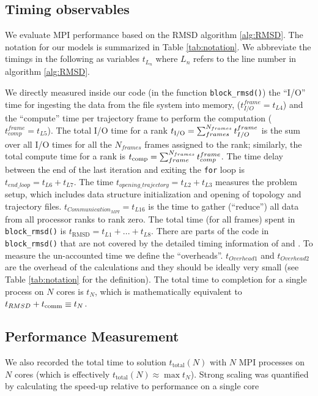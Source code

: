 \label{methods}

\subsection{Timing observables}
We evaluate MPI performance based on the RMSD algorithm \ref{alg:RMSD}. 
The notation for our models is summarized in Table \ref{tab:notation}.
We abbreviate the timings in the following as variables $t_{L_{n}}$ where $L_{n}$ refers to the line number in algorithm \ref{alg:RMSD}.

We directly measured inside our code (in the function \texttt{block\_rmsd()}) the ``I/O'' time for
ingesting the data from the file system into memory, ($t_{I/O}^{frame} = t_{L4}$) and the ``compute'' time per
trajectory frame to perform the computation ($t_{comp}^{frame} = t_{L5}$).
The total I/O time for a rank  ${t}_{\text{I/O}} = \sum_{frames}^{N_{frames}} t_{I/O}^{frame}$ is the sum over all I/O times for all the $N_{frames}$ frames assigned to the rank; similarly, the total compute time for a rank is ${t}_{\text{comp}} = \sum_{frame}^{N_{frames}} t_{comp}^{frame}$. 
The time delay between the end of the last iteration and exiting the \texttt{for} loop is $t_{end\_loop} = t_{L6}+t_{L7}$.
The time $t_{opening\_trajectory} = t_{L2}+t_{L3}$ measures the problem setup, which includes data structure initialization and opening of topology and trajectory files.
$t_{Communication_{MPI}} = t_{L16}$ is the time to gather (``reduce'') all data from all processor ranks to rank zero.
The total time (for all frames) spent in \texttt{block\_rmsd()} is $t_{\text{RMSD}} = t_{L1} + ...+ t_{L8}$. 
There are parts of the code in \texttt{block\_rmsd()} that are not covered by the detailed timing information of \tcomp and \tIO. 
To measure the un-accounted time we define the ``overheads''.
$t_{Overhead1}$ and $t_{Overhead2}$ are the overhead of the calculations and they should be ideally very small (see Table \ref{tab:notation} for the definition).  
The total time to completion for a single process on $N$ cores is $t_{N}$, which is mathematically equivalent to
$ t_{RMSD} + t_{\text{comm}} \equiv t_{N}$.

\subsection{Performance Measurement}
We also recorded the total time to solution $t_{\text{total}}(N)$ with $N$ MPI processes on $N$ cores (which is effectively
$t_{\text{total}}(N) \approx \max t_{N}$). 
Strong scaling was quantified by calculating the speed-up relative to performance on a single core

